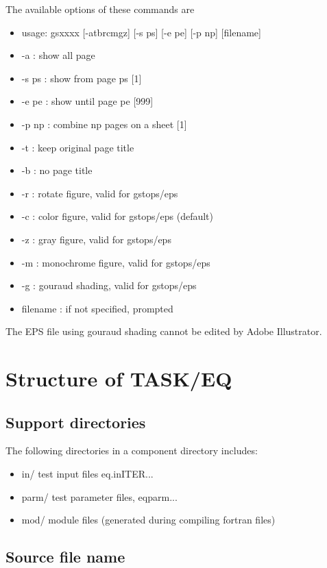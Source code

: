 \documentclass[11pt]{article}
\begin{document}
The available options of these commands are
\begin{itemize}
\item[]
usage: gsxxxx [-atbrcmgz] [-s ps] [-e pe] [-p np] [filename]
\item[\quad]-a    : show all page
\item[\quad]-s ps : show from page ps [1]
\item[\quad]-e pe : show until page pe [999]
\item[\quad]-p np : combine np pages on a sheet [1]
\item[\quad]-t    : keep original page title
\item[\quad]-b    : no page title
\item[\quad]-r    : rotate figure, valid for gstops/eps 
\item[\quad]-c    : color figure, valid for gstops/eps (default)
\item[\quad]-z    : gray figure, valid for gstops/eps 
\item[\quad]-m    : monochrome figure, valid for gstops/eps 
\item[\quad]-g    : gouraud shading, valid for gstops/eps 
\item[\quad]filename : if not specified, prompted
\end{itemize}

The EPS file using gouraud shading cannot be edited by Adobe Illustrator.

\section{Structure of TASK/EQ}

\subsection{Support directories}

The following directories in a component directory includes:
\begin{itemize}
\item[] in/ test input files eq.inITER...
\item[] parm/ test parameter files, eqparm...
\item[] mod/ module files (generated during compiling fortran files)
\end{itemize}

\subsection{Source file name}
\end{document}
